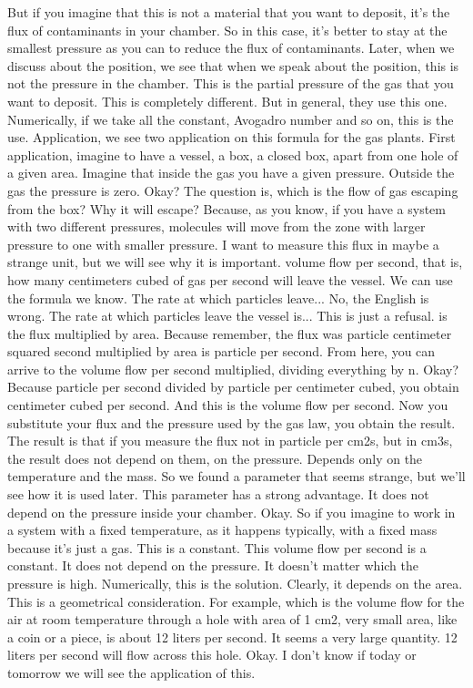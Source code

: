 But if you imagine that this is not a material that you want to deposit, it's the flux of contaminants in your chamber. So in this case, it's better to stay at the smallest pressure as you can to reduce the flux of contaminants. Later, when we discuss about the position, we see that when we speak about the position, this is not the pressure in the chamber. This is the partial pressure of the gas that you want to deposit. This is completely different. But in general, they use this one. Numerically, if we take all the constant, Avogadro number and so on, this is the use.
Application, we see two application on this formula for the gas plants. First application, imagine to have a vessel, a box, a closed box, apart from one hole of a given area. Imagine that inside the gas you have a given pressure. Outside the gas the pressure is zero. Okay? The question is, which is the flow of gas escaping from the box? Why it will escape? Because, as you know, if you have a system with two different pressures, molecules will move from the zone with larger pressure to one with smaller pressure. I want to measure this flux in maybe a strange unit, but we will see why it is important. volume flow per second, that is, how many centimeters cubed of gas per second will leave the vessel. We can use the formula we know. The rate at which particles leave... No, the English is wrong. The rate at which particles leave the vessel is... This is just a refusal. is the flux multiplied by area. Because remember, the flux was particle centimeter squared second multiplied by area is particle per second. From here, you can arrive to the volume flow per second multiplied, dividing everything by n. Okay? Because particle per second divided by particle per centimeter cubed, you obtain centimeter cubed per second. And this is the volume flow per second. Now you substitute your flux and the pressure used by the gas law, you obtain the result. The result is that if you measure the flux not in particle per cm2s, but in cm3s, the result does not depend on them, on the pressure. Depends only on the temperature and the mass. So we found a parameter that seems strange, but we'll see how it is used later. This parameter has a strong advantage. It does not depend on the pressure inside your chamber. Okay. So if you imagine to work in a system with a fixed temperature, as it happens typically, with a fixed mass because it's just a gas. This is a constant. This volume flow per second is a constant. It does not depend on the pressure. It doesn't matter which the pressure is high. Numerically, this is the solution. Clearly, it depends on the area. This is a geometrical consideration. For example, which is the volume flow for the air at room temperature through a hole with area of 1 cm2, very small area, like a coin or a piece, is about 12 liters per second. It seems a very large quantity. 12 liters per second will flow across this hole. Okay. I don't know if today or tomorrow we will see the application of this.
